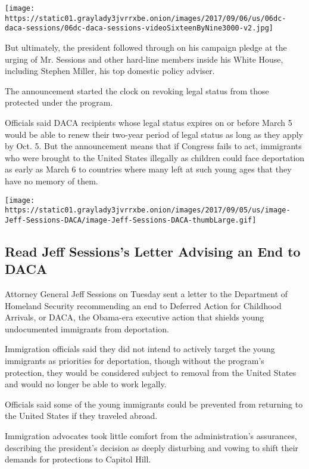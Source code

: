 \texttt{[image: https://static01.graylady3jvrrxbe.onion/images/2017/09/06/us/06dc-daca-sessions/06dc-daca-sessions-videoSixteenByNine3000-v2.jpg]}

But ultimately, the president followed through on his campaign pledge at
the urging of Mr. Sessions and other hard-line members inside his White
House, including Stephen Miller, his top domestic policy adviser.

The announcement started the clock on revoking legal status from those
protected under the program.

Officials said DACA recipients whose legal status expires on or before
March 5 would be able to renew their two-year period of legal status as
long as they apply by Oct. 5. But the announcement means that if
Congress fails to act, immigrants who were brought to the United States
illegally as children could face deportation as early as March 6 to
countries where many left at such young ages that they have no memory of
them.

\href{https://www.nytimes3xbfgragh.onion/interactive/2017/09/05/us/politics/document-Jeff-Sessions-DACA.html}{}

\texttt{[image: https://static01.graylady3jvrrxbe.onion/images/2017/09/05/us/image-Jeff-Sessions-DACA/image-Jeff-Sessions-DACA-thumbLarge.gif]}

\hypertarget{read-jeff-sessionss-letter-advising-an-end-to-daca}{%
\subsection{Read Jeff Sessions's Letter Advising an End to
DACA}\label{read-jeff-sessionss-letter-advising-an-end-to-daca}}

Attorney General Jeff Sessions on Tuesday sent a letter to the
Department of Homeland Security recommending an end to Deferred Action
for Childhood Arrivals, or DACA, the Obama-era executive action that
shields young undocumented immigrants from deportation.

Immigration officials said they did not intend to actively target the
young immigrants as priorities for deportation, though without the
program's protection, they would be considered subject to removal from
the United States and would no longer be able to work legally.

Officials said some of the young immigrants could be prevented from
returning to the United States if they traveled abroad.

Immigration advocates took little comfort from the administration's
assurances, describing the president's decision as deeply disturbing and
vowing to shift their demands for protections to Capitol Hill.

